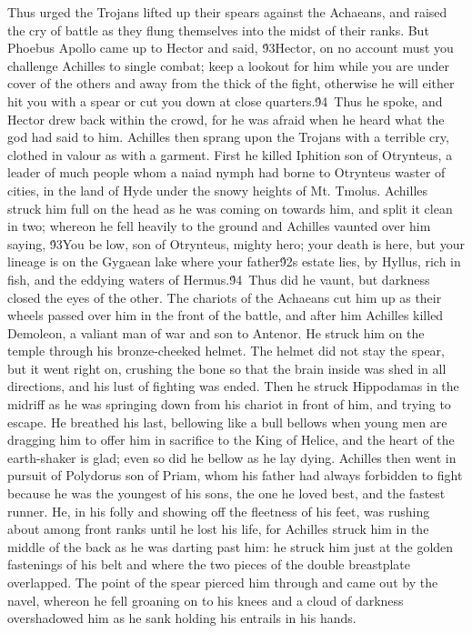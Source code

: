 {Thus urged the Trojans lifted up their spears against the Achaeans, and raised the cry of battle as they flung themselves into the midst of their ranks. But Phoebus Apollo came up to Hector and said, \'93Hector, on no account must you challenge Achilles to single combat; keep a lookout for him while you are under cover of the others and away from the thick of the fight, otherwise he will either hit you with a spear or cut you down at close quarters.\'94\
Thus he spoke, and Hector drew back within the crowd, for he was afraid when he heard what the god had said to him. Achilles then sprang upon the Trojans with a terrible cry, clothed in valour as with a garment. First he killed Iphition son of Otrynteus, a leader of much people whom a naiad nymph had borne to Otrynteus waster of cities, in the land of Hyde under the snowy heights of Mt. Tmolus. Achilles struck him full on the head as he was coming on towards him, and split it clean in two; whereon he fell heavily to the ground and Achilles vaunted over him saying, \'93You be low, son of Otrynteus, mighty hero; your death is here, but your lineage is on the Gygaean lake where your father\'92s estate lies, by Hyllus, rich in fish, and the eddying waters of Hermus.\'94\
Thus did he vaunt, but darkness closed the eyes of the other. The chariots of the Achaeans cut him up as their wheels passed over him in the front of the battle, and after him Achilles killed Demoleon, a valiant man of war and son to Antenor. He struck him on the temple through his bronze-cheeked helmet. The helmet did not stay the spear, but it went right on, crushing the bone so that the brain inside was shed in all directions, and his lust of fighting was ended. Then he struck Hippodamas in the midriff as he was springing down from his chariot in front of him, and trying to escape. He breathed his last, bellowing like a bull bellows when young men are dragging him to offer him in sacrifice to the King of Helice, and the heart of the earth-shaker is glad; even so did he bellow as he lay dying. Achilles then went in pursuit of Polydorus son of Priam, whom his father had always forbidden to fight because he was the youngest of his sons, the one he loved best, and the fastest runner. He, in his folly and showing off the fleetness of his feet, was rushing about among front ranks until he lost his life, for Achilles struck him in the middle of the back as he was darting past him: he struck him just at the golden fastenings of his belt and where the two pieces of the double breastplate overlapped. The point of the spear pierced him through and came out by the navel, whereon he fell groaning on to his knees and a cloud of darkness overshadowed him as he sank holding his entrails in his hands.\
}
